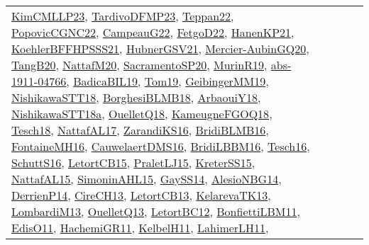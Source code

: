 {\begin{longtable}{lp{3cm}>{\raggedright}p{6cm}>{\raggedright}p{6cm}p{8cm}}
\href{papers/KimCMLLP23.pdf}{KimCMLLP23}\cite{KimCMLLP23}, \href{papers/TardivoDFMP23.pdf}{TardivoDFMP23}\cite{TardivoDFMP23}, \href{papers/Teppan22.pdf}{Teppan22}\cite{Teppan22}, \href{papers/PopovicCGNC22.pdf}{PopovicCGNC22}\cite{PopovicCGNC22}, \href{articles/CampeauG22.pdf}{CampeauG22}\cite{CampeauG22}, \href{articles/FetgoD22.pdf}{FetgoD22}\cite{FetgoD22}, \href{papers/HanenKP21.pdf}{HanenKP21}\cite{HanenKP21}, \href{articles/KoehlerBFFHPSSS21.pdf}{KoehlerBFFHPSSS21}\cite{KoehlerBFFHPSSS21}, \href{articles/HubnerGSV21.pdf}{HubnerGSV21}\cite{HubnerGSV21}, \href{papers/Mercier-AubinGQ20.pdf}{Mercier-AubinGQ20}\cite{Mercier-AubinGQ20}, \href{papers/TangB20.pdf}{TangB20}\cite{TangB20}, \href{papers/NattafM20.pdf}{NattafM20}\cite{NattafM20}, \href{articles/SacramentoSP20.pdf}{SacramentoSP20}\cite{SacramentoSP20}, \href{papers/MurinR19.pdf}{MurinR19}\cite{MurinR19}, \href{articles/abs-1911-04766.pdf}{abs-1911-04766}\cite{abs-1911-04766}, \href{papers/BadicaBIL19.pdf}{BadicaBIL19}\cite{BadicaBIL19}, \href{papers/Tom19.pdf}{Tom19}\cite{Tom19}, \href{papers/GeibingerMM19.pdf}{GeibingerMM19}\cite{GeibingerMM19}, \href{papers/NishikawaSTT18.pdf}{NishikawaSTT18}\cite{NishikawaSTT18}, \href{articles/BorghesiBLMB18.pdf}{BorghesiBLMB18}\cite{BorghesiBLMB18}, \href{papers/ArbaouiY18.pdf}{ArbaouiY18}\cite{ArbaouiY18}, \href{papers/NishikawaSTT18a.pdf}{NishikawaSTT18a}\cite{NishikawaSTT18a}, \href{papers/OuelletQ18.pdf}{OuelletQ18}\cite{OuelletQ18}, \href{papers/KameugneFGOQ18.pdf}{KameugneFGOQ18}\cite{KameugneFGOQ18}, \href{papers/Tesch18.pdf}{Tesch18}\cite{Tesch18}, \href{articles/NattafAL17.pdf}{NattafAL17}\cite{NattafAL17}, \href{articles/ZarandiKS16.pdf}{ZarandiKS16}\cite{ZarandiKS16}, \href{articles/BridiBLMB16.pdf}{BridiBLMB16}\cite{BridiBLMB16}, \href{papers/FontaineMH16.pdf}{FontaineMH16}\cite{FontaineMH16}, \href{papers/CauwelaertDMS16.pdf}{CauwelaertDMS16}\cite{CauwelaertDMS16}, \href{papers/BridiLBBM16.pdf}{BridiLBBM16}\cite{BridiLBBM16}, \href{papers/Tesch16.pdf}{Tesch16}\cite{Tesch16}, \href{papers/SchuttS16.pdf}{SchuttS16}\cite{SchuttS16}, \href{articles/LetortCB15.pdf}{LetortCB15}\cite{LetortCB15}, \href{papers/PraletLJ15.pdf}{PraletLJ15}\cite{PraletLJ15}, \href{papers/KreterSS15.pdf}{KreterSS15}\cite{KreterSS15}, \href{articles/NattafAL15.pdf}{NattafAL15}\cite{NattafAL15}, \href{articles/SimoninAHL15.pdf}{SimoninAHL15}\cite{SimoninAHL15}, \href{papers/GaySS14.pdf}{GaySS14}\cite{GaySS14}, \href{papers/AlesioNBG14.pdf}{AlesioNBG14}\cite{AlesioNBG14}, \href{papers/DerrienP14.pdf}{DerrienP14}\cite{DerrienP14}, \href{papers/CireCH13.pdf}{CireCH13}\cite{CireCH13}, \href{papers/LetortCB13.pdf}{LetortCB13}\cite{LetortCB13}, \href{papers/KelarevaTK13.pdf}{KelarevaTK13}\cite{KelarevaTK13}, \href{papers/LombardiM13.pdf}{LombardiM13}\cite{LombardiM13}, \href{papers/OuelletQ13.pdf}{OuelletQ13}\cite{OuelletQ13}, \href{papers/LetortBC12.pdf}{LetortBC12}\cite{LetortBC12}, \href{papers/BonfiettiLBM11.pdf}{BonfiettiLBM11}\cite{BonfiettiLBM11}, \href{papers/EdisO11.pdf}{EdisO11}\cite{EdisO11}, \href{articles/HachemiGR11.pdf}{HachemiGR11}\cite{HachemiGR11}, \href{articles/KelbelH11.pdf}{KelbelH11}\cite{KelbelH11}, \href{papers/LahimerLH11.pdf}{LahimerLH11}\cite{LahimerLH11}, 
\end{longtable}}
